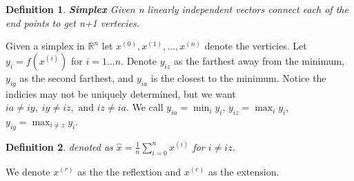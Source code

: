 \documentclass[12pt]{article}
\newcommand{\RRn}{\mathbb{R}^n}
\newcommand{\ver}[2]{{#1}^{(#2)}}
\newtheorem{definition}{Definition}
\begin{document}
	\begin{definition}
		\textbf{Simplex} Given n linearly independent vectors connect each of the end points to get n+1 vertecies.
	\end{definition}

Given a simplex in $ \RRn $ let $ \ver{x}{0},\ver{x}{1},\dots,\ver{x}{n} $ denote the verticies. Let $ y_i=f(\ver{x}{i}) $ for $ i=1\dots n.$ Denote $ y_{iz} $ as the farthest away from the minimum, $ y_{iy} $ as the second farthest, and $ y_{ia}$ is the closest to the minimum. Notice the indicies may not be uniquely determined, but we want $ ia\neq iy,\; iy\neq iz,\text{ and } iz \neq ia. $ We call $ y_{ia}=\min_i y_i $, $y_{iz}=\max_{i} y_i$, $y_{iy}=\max_{i \neq z} y_i.$  

\begin{definition}
	 denoted as $ \hat{x}=\frac{1}{n}\sum_{i=0}^{n} \ver{x}{i} $ for $ i\neq iz $.
\end{definition}

We denote $ \ver{x}{r} $ as the the reflextion and $ \ver{x}{e} $ as the extension. 
	
\end{document}
